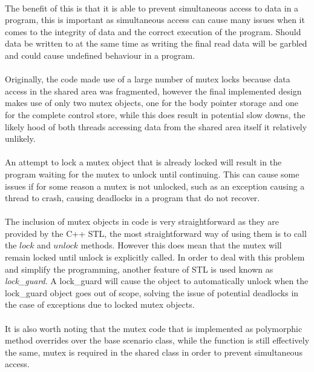 \paragraph{}
The benefit of this is that it is able to prevent simultaneous access to data in a program, this is important as simultaneous access can cause many issues when it comes to the integrity of data and the correct execution of the program. Should data be written to at the same time as writing the final read data will be garbled and could cause undefined behaviour in a program.

\paragraph{}
Originally, the code made use of a large number of mutex locks because data access in the shared area was fragmented, however the final implemented design makes use of only two mutex objects, one for the body pointer storage and one for the complete control store, while this does result in potential slow downs, the likely hood of both threads accessing data from the shared area itself it relatively unlikely.

\paragraph{}
An attempt to lock a mutex object that is already locked will result in the program waiting for the mutex to unlock until continuing. This can cause some issues if for some reason a mutex is not unlocked, such as an exception causing a thread to crash, causing deadlocks in a program that do not recover.

\paragraph{}
The inclusion of mutex objects in code is very straightforward as they are provided by the C++ STL, the most straightforward way of using them is to call the $lock$ and $unlock$ methods. However this does mean that the mutex will remain locked until unlock is explicitly called. In order to deal with this problem and simplify the programming, another feature of STL is used known as \textit{lock\_guard}. A lock\_guard will cause the object to automatically unlock when the lock\_guard object goes out of scope, solving the issue of potential deadlocks in the case of exceptions due to locked mutex objects.

\paragraph{}
It is also worth noting that the mutex code that is implemented as polymorphic method overrides over the base scenario class, while the function is still effectively the same, mutex is required in the shared class in order to prevent simultaneous access.

